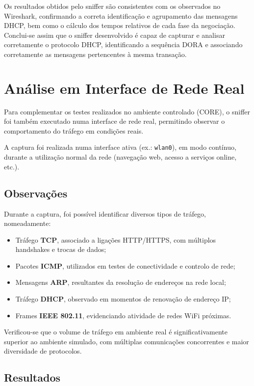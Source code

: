 \documentclass[a4paper,12pt]{article}
\begin{document}
Os resultados obtidos pelo sniffer são consistentes com os observados no Wireshark,
confirmando a correta identificação e agrupamento das mensagens DHCP, bem como o
cálculo dos tempos relativos de cada fase da negociação.
Conclui-se assim que o sniffer desenvolvido é capaz de capturar e analisar corretamente
o protocolo DHCP, identificando a sequência DORA e associando corretamente as mensagens
pertencentes à mesma transação.

\section{Análise em Interface de Rede Real}

Para complementar os testes realizados no ambiente controlado (CORE), o sniffer foi também executado numa interface de rede real, permitindo observar o comportamento do tráfego em condições reais.

A captura foi realizada numa interface ativa (ex.: \texttt{wlan0}), em modo contínuo, durante a utilização normal da rede (navegação web, acesso a serviços online, etc.).

\subsection{Observações}

Durante a captura, foi possível identificar diversos tipos de tráfego, nomeadamente:

\begin{itemize}
    \item Tráfego \textbf{TCP}, associado a ligações HTTP/HTTPS, com múltiplos handshakes e trocas de dados;
    \item Pacotes \textbf{ICMP}, utilizados em testes de conectividade e controlo de rede;
    \item Mensagens \textbf{ARP}, resultantes da resolução de endereços na rede local;
    \item Tráfego \textbf{DHCP}, observado em momentos de renovação de endereço IP;
    \item Frames \textbf{IEEE 802.11}, evidenciando atividade de redes WiFi próximas.
\end{itemize}

Verificou-se que o volume de tráfego em ambiente real é significativamente superior ao ambiente simulado, com múltiplas comunicações concorrentes e maior diversidade de protocolos.

\subsection{Resultados}
\end{document}
